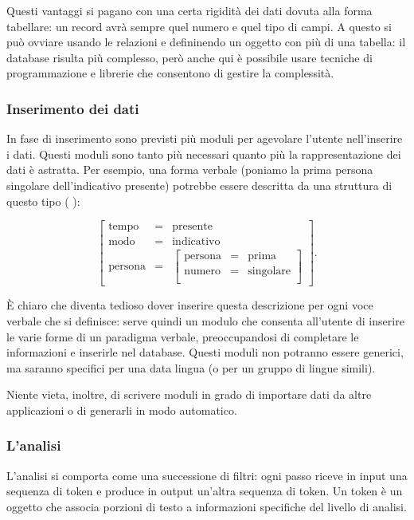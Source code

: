 \documentclass[twoside,stylearticle,11pt,filologia,it,article,bibsection]{spinoza}
\newenvironment{lingmeq}{\begin{lingeq}\[}{\]\end{lingeq}}
\begin{document}
Questi vantaggi si pagano con una certa rigidità dei dati dovuta alla
forma tabellare: un record avrà sempre quel numero e quel tipo di
campi. A questo si può ovviare usando le relazioni e defininendo un
oggetto con più di una tabella: il database risulta più complesso,
però anche qui è possibile usare tecniche di programmazione e librerie
che consentono di gestire la complessità.

\subsubsection{Inserimento dei dati}

In fase di inserimento sono previsti più moduli per agevolare l'utente
nell'inserire i dati. Questi moduli sono tanto più necessari quanto
più la rappresentazione dei dati è astratta. Per esempio, una forma
verbale (poniamo la prima persona singolare dell'indicativo presente)
potrebbe essere descritta da una struttura di questo tipo (\vedi
{}):
\begin{lingmeq}
\left[\begin{array}{lll}
\text{tempo} &=& \text{presente}\\
\text{modo} &=& \text{indicativo}\\
\text{persona} &=&\left[\begin{array}{lll}
\text{persona} &=& \text{prima}\\
\text{numero} &=& \text{singolare}\\
\end{array}\right]
\end{array}\right].
\end{lingmeq}
\noindent È chiaro che diventa tedioso dover inserire questa
descrizione per ogni voce verbale che si definisce: serve quindi un
modulo che consenta all'utente di inserire le varie forme di un
paradigma verbale, preoccupandosi di completare le informazioni e
inserirle nel database. Questi moduli non potranno essere generici, ma
saranno specifici per una data lingua (o per un gruppo di lingue
simili).

Niente vieta, inoltre, di scrivere moduli in grado di importare dati
da altre applicazioni o di generarli in modo automatico.

\subsubsection{L'analisi}

L'analisi si comporta come una successione di filtri: ogni passo
riceve in input una sequenza di token e produce in output un'altra
sequenza di token. Un token è un oggetto che associa porzioni di testo
a informazioni specifiche del livello di analisi.
\end{document}
